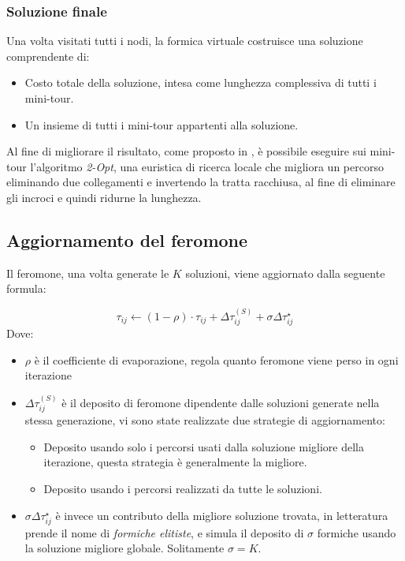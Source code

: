 \documentclass[11pt,a4paper]{article}
\begin{document}
\subsubsection{Soluzione finale}
Una volta visitati tutti i nodi, la formica virtuale costruisce una soluzione comprendente di:
\begin{itemize}
    \item Costo totale della soluzione, intesa come lunghezza complessiva di tutti i mini-tour.
    \item Un insieme di tutti i mini-tour appartenti alla soluzione.
\end{itemize}
Al fine di migliorare il risultato, come proposto in \cite{Bullnheimer}, è possibile eseguire sui mini-tour l'algoritmo \textit{2-Opt}, una euristica di ricerca locale che migliora un percorso eliminando due collegamenti e invertendo la tratta racchiusa, al fine di eliminare gli incroci e quindi ridurne la lunghezza.


\subsection{Aggiornamento del feromone}
Il feromone, una volta generate le \(K\) soluzioni, viene aggiornato dalla seguente formula:

\[
\tau_{ij} \xleftarrow{} (1-\rho)\cdot\tau_{ij} + \Delta\tau^{(S)}_{ij} + \sigma\Delta{\tau^\star_{ij}}
\]
Dove:
\begin{itemize}
    \item \(\rho\) è il coefficiente di evaporazione, regola quanto feromone viene perso in ogni iterazione
    \item \(\Delta\tau^{(S)}_{ij}\) è il deposito di feromone dipendente dalle soluzioni generate nella stessa generazione, vi sono state realizzate due strategie di aggiornamento:
    \begin{itemize}
        \item Deposito usando solo i percorsi usati dalla soluzione migliore della iterazione, questa strategia è generalmente la migliore.
        \item Deposito usando i percorsi realizzati da tutte le soluzioni.
    \end{itemize}
\item \(\sigma\Delta{\tau^\star_{ij}}\) è invece un contributo della migliore soluzione trovata, in letteratura prende il nome di \textit{formiche elitiste}, e simula il deposito di \(\sigma\) formiche usando la soluzione migliore globale. Solitamente \(\sigma = K\).
\end{itemize}
\end{document}
